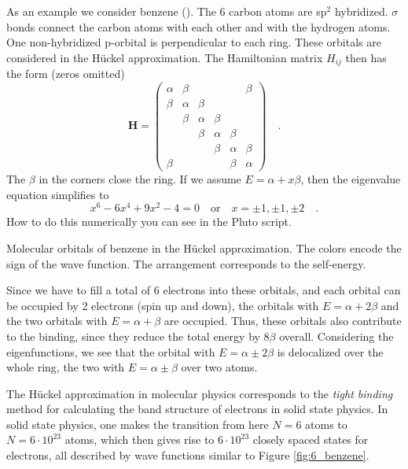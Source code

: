As an example we consider benzene (). The 6 carbon atoms are sp$^2$ hybridized. $\sigma$ bonds connect the carbon atoms with each other and with the hydrogen atoms. One non-hybridized p-orbital is perpendicular to each ring. These orbitals are considered in the Hückel approximation. The Hamiltonian matrix $H_{ij}$ then has the form (zeros omitted)
\begin{equation}
\mathbf{H} = 
 \begin{pmatrix}
  \alpha & \beta & & &  & \beta \\
  \beta & \alpha & \beta & & \\
  & \beta & \alpha & \beta & & \\
 & & \beta & \alpha & \beta & \\
& & & \beta & \alpha & \beta \\
\beta &  & & & \beta & \alpha 
 \end{pmatrix}  \quad .
\end{equation}
The $\beta$ in the corners close the ring.
If we assume $E = \alpha + x \beta$, then the eigenvalue equation simplifies to 
\begin{equation}
x^6 - 6 x^4 + 9x^2 - 4 = 0 \quad \text{or} \quad x = \pm 1, \pm 1, \pm 2 \quad .
\end{equation}
How to do this numerically you can see in the  
Pluto script.




\begin{marginfigure}[20mm]
\caption{Molecular orbitals of benzene in the Hückel approximation. The colors encode the sign of the wave function. The arrangement corresponds to the self-energy.\label{fig:6_benzene}}
\end{marginfigure}

Since we have to fill a total of 6 electrons into these orbitals, and each orbital can be occupied by 2 electrons (spin up and down), the orbitals with $E=\alpha + 2 \beta$ and the two orbitals with $E = \alpha + \beta$ are occupied. Thus, these orbitals also contribute to the binding, since they reduce the total energy by $8\beta$ overall. Considering the eigenfunctions, we see that the orbital with $E=\alpha \pm 2 \beta$ is delocalized over the whole ring, the two with $E = \alpha \pm \beta$ over two atoms.

The Hückel approximation in molecular physics corresponds to the \emph{tight binding} method for calculating the band structure of electrons in solid state physics. In solid state physics, one makes the transition from here $N=6$ atoms to $N= 6 \cdot 10^{23}$ atoms, which then gives rise to $6 \cdot 10^{23}$ closely spaced states for electrons, all described by wave functions similar to Figure \ref{fig:6_benzene}.

